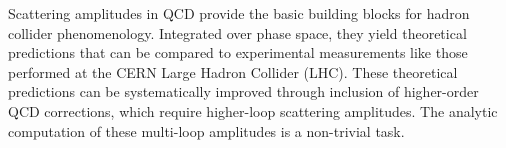 
Scattering amplitudes in QCD provide the basic building blocks for hadron
collider phenomenology. Integrated over phase space, they yield theoretical
predictions that can be compared to experimental measurements like those
performed at the CERN Large Hadron Collider (LHC). These theoretical
predictions can be systematically improved through inclusion of higher-order
QCD corrections, which require higher-loop scattering amplitudes.  The analytic
computation of these multi-loop amplitudes is a non-trivial task.

